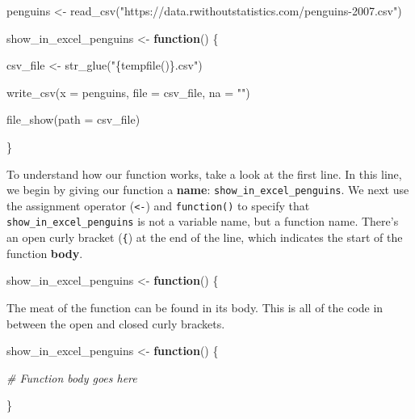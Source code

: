 \documentclass[
]{book}
\newenvironment{Shaded}{\begin{snugshade}}{\end{snugshade}}
\newcommand{\AttributeTok}[1]{\textcolor[rgb]{0.77,0.63,0.00}{#1}}
\newcommand{\CommentTok}[1]{\textcolor[rgb]{0.56,0.35,0.01}{\textit{#1}}}
\newcommand{\ControlFlowTok}[1]{\textcolor[rgb]{0.13,0.29,0.53}{\textbf{#1}}}
\newcommand{\FunctionTok}[1]{\textcolor[rgb]{0.00,0.00,0.00}{#1}}
\newcommand{\NormalTok}[1]{#1}
\newcommand{\OtherTok}[1]{\textcolor[rgb]{0.56,0.35,0.01}{#1}}
\newcommand{\StringTok}[1]{\textcolor[rgb]{0.31,0.60,0.02}{#1}}
\begin{document}
\begin{Shaded}
\begin{Highlighting}[]
\NormalTok{penguins }\OtherTok{\textless{}{-}} \FunctionTok{read\_csv}\NormalTok{(}\StringTok{"https://data.rwithoutstatistics.com/penguins{-}2007.csv"}\NormalTok{)}

\NormalTok{show\_in\_excel\_penguins }\OtherTok{\textless{}{-}} \ControlFlowTok{function}\NormalTok{() \{}
  
\NormalTok{  csv\_file }\OtherTok{\textless{}{-}} \FunctionTok{str\_glue}\NormalTok{(}\StringTok{"\{tempfile()\}.csv"}\NormalTok{)}
  
  \FunctionTok{write\_csv}\NormalTok{(}\AttributeTok{x =}\NormalTok{ penguins,}
            \AttributeTok{file =}\NormalTok{ csv\_file,}
            \AttributeTok{na =} \StringTok{""}\NormalTok{)}
  
  \FunctionTok{file\_show}\NormalTok{(}\AttributeTok{path =}\NormalTok{ csv\_file)}
  
\NormalTok{\}}
\end{Highlighting}
\end{Shaded}

To understand how our function works, take a look at the first line. In this line, we begin by giving our function a \textbf{name}: \texttt{show\_in\_excel\_penguins}. We next use the assignment operator (\texttt{\textless{}-}) and \texttt{function()} to specify that \texttt{show\_in\_excel\_penguins} is not a variable name, but a function name. There's an open curly bracket (\texttt{\{}) at the end of the line, which indicates the start of the function \textbf{body}.

\begin{Shaded}
\begin{Highlighting}[]
\NormalTok{show\_in\_excel\_penguins }\OtherTok{\textless{}{-}} \ControlFlowTok{function}\NormalTok{() \{}
\end{Highlighting}
\end{Shaded}

The meat of the function can be found in its body. This is all of the code in between the open and closed curly brackets.

\begin{Shaded}
\begin{Highlighting}[]
\NormalTok{show\_in\_excel\_penguins }\OtherTok{\textless{}{-}} \ControlFlowTok{function}\NormalTok{() \{}
  
  \CommentTok{\# Function body goes here}
  
\NormalTok{\}}
\end{Highlighting}
\end{Shaded}
\end{document}
